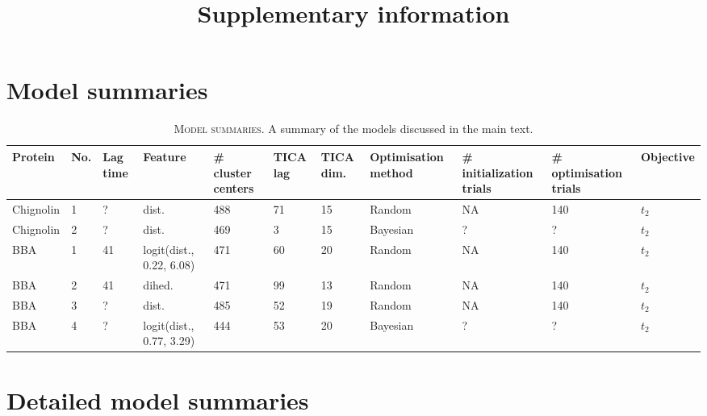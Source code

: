 \documentclass{article}
\title{Supplementary information}
\begin{document}
\maketitle

\section{Model summaries}



\begin{table}[h]
    \centering
    \caption{\textsc{Model summaries.} A summary of the models discussed in the main text.}
    \begin{tabularx}{\textwidth}{XXXXXXXXXXX}
    \toprule
    Protein & No. & Lag time & Feature & \# cluster centers & TICA lag & TICA dim. & Optimisation method & \# initialization trials & \# optimisation trials & Objective  \\
    \midrule
     Chignolin    & 1 & ? & dist. & 488 & 71 & 15 & Random & NA & 140 & $t_{2}$ \\
     Chignolin    & 2 & ? & dist. & 469 & 3 & 15 & Bayesian & ? & ? & $t_{2}$ \\
     BBA    & 1 & 41 & logit(dist., 0.22, 6.08) & 471 & 60 & 20 & Random & NA & 140 & $t_{2}$ \\
     BBA    & 2 & 41 & dihed. & 471 & 99 & 13 & Random & NA & 140 & $t_{2}$ \\
     BBA    & 3 & ? & dist. & 485 & 52 & 19 & Random & NA & 140 & $t_{2}$ \\
     BBA    & 4 & ? & logit(dist., 0.77, 3.29) & 444 & 53 & 20 & Bayesian & ? & ? & $t_{2}$ \\
    \bottomrule
    \end{tabularx}
    \label{si_tab:modelsummaries}
\end{table}

\section{Detailed model summaries} 
    
\end{document}
